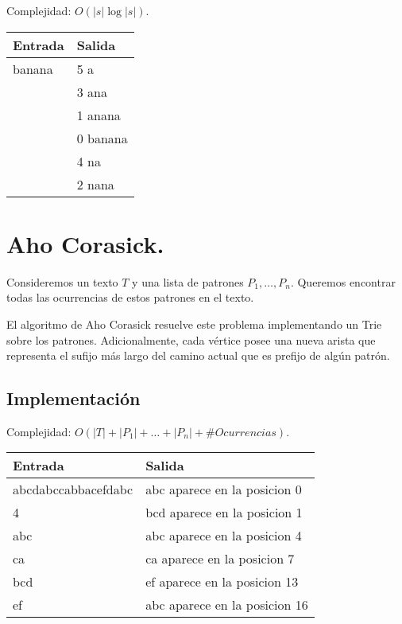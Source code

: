 \documentclass[12pt, letterpaper, twoside]{article}
\begin{document}
Complejidad: $O(|s|\log |s|)$.

 \medskip

\begin{tabular}{|p{7cm}|p{7cm}|}
\hline
\textbf{Entrada} & \textbf{Salida}\\ \hline
banana & 5 a\\
       & 3 ana\\
       & 1 anana\\
       & 0 banana\\
       & 4 na\\
       & 2 nana\\ \hline
\end{tabular}

\newpage

\section{Aho Corasick.}

Consideremos un texto $T$ y una lista de patrones $P_1, \ldots, P_n$. Queremos encontrar todas las ocurrencias de estos patrones en el texto.

El algoritmo de Aho Corasick resuelve este problema implementando un Trie sobre los patrones. Adicionalmente, cada vértice posee una nueva arista que representa el sufijo más largo del camino actual que es prefijo de algún patrón.

\subsection{Implementación}

Complejidad: $O(|T| + |P_1| + \ldots + |P_n| + \#Ocurrencias)$.

 \medskip

\begin{tabular}{|p{7cm}|p{7cm}|}
\hline
\textbf{Entrada} & \textbf{Salida}\\ \hline
abcdabccabbacefdabc & abc aparece en la posicion 0\\
4                   & bcd aparece en la posicion 1\\
abc                 & abc aparece en la posicion 4\\
ca                  & ca aparece en la posicion 7\\
bcd                 & ef aparece en la posicion 13\\
ef                  & abc aparece en la posicion 16\\ \hline
\end{tabular}

\newpage
\end{document}
